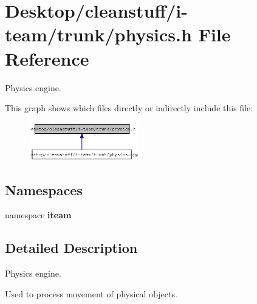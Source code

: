 \section{Desktop/cleanstuff/i-team/trunk/physics.h File Reference}
\label{physics_8h}
Physics engine. 



This graph shows which files directly or indirectly include this file:\nopagebreak
\begin{figure}[H]
\begin{center}
\leavevmode
\includegraphics[width=136pt]{physics_8h__dep__incl}
\end{center}
\end{figure}
\subsection*{Namespaces}
\begin{CompactItemize}
\item 
namespace {\bf iteam}
\end{CompactItemize}


\subsection{Detailed Description}
Physics engine. 

Used to process movement of physical objects. 